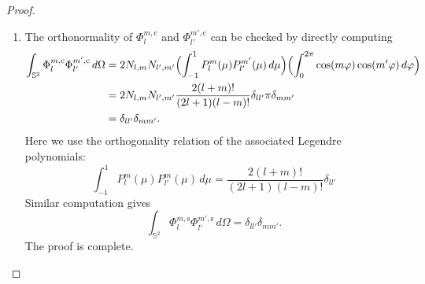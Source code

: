 \documentclass[10pt,a4paper]{amsart}
\begin{document}
\begin{proof}
\begin{enumerate}
    \item 
    The orthonormality of \(\Phi_l^{m,\mathrm c}\) and \(\Phi_{l'}^{m',\mathrm c}\) can be checked by directly computing
    \begin{equation}
    \begin{aligned}
        \int_{\mathbb S^2}\Phi_l^{m,\mathrm c}\Phi_{l'}^{m',\mathrm c}\,d\Omega ={}&
        2N_{l,m}N_{l',m'}\Bigl(\int_{-1}^1 P_l^m(\mu)P_{l'}^{m'}(\mu)\,d\mu\Bigr)\Bigl(\int_0^{2\pi}\cos(m\varphi)\cos(m'\varphi)\,d\varphi\Bigr) \\
        ={}& 2N_{l,m}N_{l',m'} \frac{2(l+m)!}{(2l+1)(l-m)!}\delta_{ll'} \pi \delta_{mm'} \\
        ={}& \delta_{ll'}\delta_{mm'}.
    \end{aligned}
    \end{equation}
    Here we use the orthogonality relation of the associated Legendre polynomials:
    \begin{equation}
        \int_{-1}^1 P_l^m(\mu)P_{l'}^m(\mu)\,d\mu = \frac{2(l+m)!}{(2l+1)(l-m)!}\delta_{ll'}
    \end{equation}
    Similar computation gives
    \begin{equation}
    \int_{\mathbb S^2}\Phi_l^{m,\mathrm s}\Phi_{l'}^{m',\mathrm s}\,d\Omega = \delta_{ll'}\delta_{mm'}.
    \end{equation}
    The proof is complete.
\end{enumerate}
\end{proof}
\end{document}
